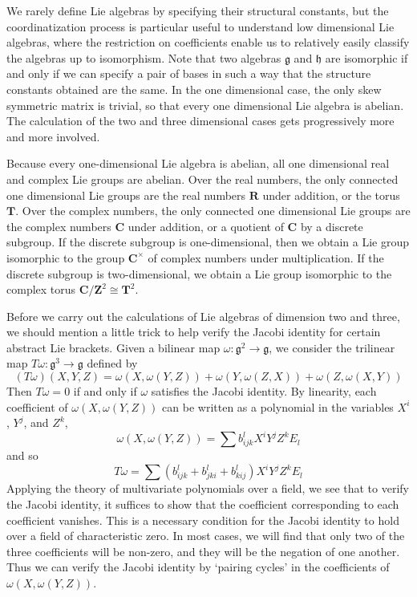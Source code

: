 We rarely define Lie algebras by specifying their structural constants, but the coordinatization process is particular useful to understand low dimensional Lie algebras, where the restriction on coefficients enable us to relatively easily classify the algebras up to isomorphism. Note that two algebras $\mathfrak{g}$ and $\mathfrak{h}$ are isomorphic if and only if we can specify a pair of bases in such a way that the structure constants obtained are the same. In the one dimensional case, the only skew symmetric matrix is trivial, so that every one dimensional Lie algebra is abelian. The calculation of the two and three dimensional cases gets progressively more and more involved.

\begin{example}
    Because every one-dimensional Lie algebra is abelian, all one dimensional real and complex Lie groups are abelian. Over the real numbers, the only connected one dimensional Lie groups are the real numbers $\mathbf{R}$ under addition, or the torus $\mathbf{T}$. Over the complex numbers, the only connected one dimensional Lie groups are the complex numbers $\mathbf{C}$ under addition, or a quotient of $\mathbf{C}$ by a discrete subgroup. If the discrete subgroup is one-dimensional, then we obtain a Lie group isomorphic to the group $\mathbf{C}^\times$ of complex numbers under multiplication. If the discrete subgroup is two-dimensional, we obtain a Lie group isomorphic to the complex torus $\mathbf{C}/\mathbf{Z}^2 \cong \mathbf{T}^2$.
\end{example}

Before we carry out the calculations of Lie algebras of dimension two and three, we should mention a little trick to help verify the Jacobi identity for certain abstract Lie brackets. Given a bilinear map $\omega: \mathfrak{g}^2 \to \mathfrak{g}$, we consider the trilinear map $T\omega: \mathfrak{g}^3 \to \mathfrak{g}$ defined by
%
\[ (T \omega)(X,Y,Z) = \omega(X, \omega(Y,Z)) + \omega(Y,\omega(Z,X)) + \omega(Z,\omega(X,Y)) \]
%
Then $T \omega = 0$ if and only if $\omega$ satisfies the Jacobi identity. By linearity, each coefficient of $\omega(X,\omega(Y,Z))$ can be written as a polynomial in the variables $X^i$, $Y^j$, and $Z^k$,
%
\[ \omega(X, \omega(Y,Z)) = \sum b_{ijk}^l X^i Y^j Z^k E_l \]
%
and so
%
\[ T\omega = \sum (b_{ijk}^l + b_{jki}^l + b_{kij}^l) X^i Y^j Z^k E_l \]
%
Applying the theory of multivariate polynomials over a field, we see that to verify the Jacobi identity, it suffices to show that the coefficient corresponding to each coefficient vanishes. This is a necessary condition for the Jacobi identity to hold over a field of characteristic zero. In most cases, we will find that only two of the three coefficients will be non-zero, and they will be the negation of one another. Thus we can verify the Jacobi identity by `pairing cycles' in the coefficients of $\omega(X,\omega(Y,Z))$.


